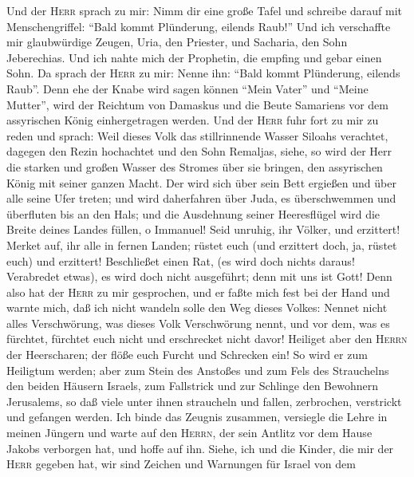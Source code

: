  Und der \textsc{Herr} sprach zu mir: Nimm dir eine große
Tafel und schreibe darauf mit Menschengriffel: ``Bald kommt Plünderung,
eilends Raub!''  Und ich verschaffte mir glaubwürdige
Zeugen, Uria, den Priester, und Sacharia, den Sohn Jeberechias.
 Und ich nahte mich der Prophetin, die empfing und gebar
einen Sohn. Da sprach der \textsc{Herr} zu mir: Nenne ihn: ``Bald kommt
Plünderung, eilends Raub''.  Denn ehe der Knabe wird sagen
können ``Mein Vater'' und ``Meine Mutter'', wird der Reichtum von
Damaskus und die Beute Samariens vor dem assyrischen König
einhergetragen werden.  Und der \textsc{Herr} fuhr fort zu
mir zu reden und sprach:  Weil dieses Volk das
stillrinnende Wasser Siloahs verachtet, dagegen den Rezin hochachtet und
den Sohn Remaljas,  siehe, so wird der Herr die starken
und großen Wasser des Stromes über sie bringen, den assyrischen König
mit seiner ganzen Macht. Der wird sich über sein Bett ergießen und über
alle seine Ufer treten;  und wird daherfahren über Juda,
es überschwemmen und überfluten bis an den Hals; und die Ausdehnung
seiner Heeresflügel wird die Breite deines Landes füllen, o Immanuel!
 Seid unruhig, ihr Völker, und erzittert! Merket auf, ihr
alle in fernen Landen; rüstet euch (und erzittert doch, ja, rüstet euch)
und erzittert!  Beschließet einen Rat, (es wird doch
nichts daraus! Verabredet etwas), es wird doch nicht ausgeführt; denn
mit uns ist Gott!  Denn also hat der \textsc{Herr} zu mir
gesprochen, und er faßte mich fest bei der Hand und warnte mich, daß ich
nicht wandeln solle den Weg dieses Volkes:  Nennet nicht
alles Verschwörung, was dieses Volk Verschwörung nennt, und vor dem, was
es fürchtet, fürchtet euch nicht und erschrecket nicht davor!
 Heiliget aber den \textsc{Herrn} der Heerscharen; der
flöße euch Furcht und Schrecken ein!  So wird er zum
Heiligtum werden; aber zum Stein des Anstoßes und zum Fels des
Strauchelns den beiden Häusern Israels, zum Fallstrick und zur Schlinge
den Bewohnern Jerusalems,  so daß viele unter ihnen
straucheln und fallen, zerbrochen, verstrickt und gefangen werden.
 Ich binde das Zeugnis zusammen, versiegle die Lehre in
meinen Jüngern  und warte auf den \textsc{Herrn}, der
sein Antlitz vor dem Hause Jakobs verborgen hat, und hoffe auf ihn.
 Siehe, ich und die Kinder, die mir der \textsc{Herr}
gegeben hat, wir sind Zeichen und Warnungen für Israel von dem
